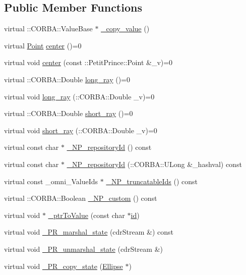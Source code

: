 \subsection*{Public Member Functions}
\begin{DoxyCompactItemize}
\item 
virtual \+::C\+O\+R\+B\+A\+::\+Value\+Base $\ast$ \hyperlink{class_ellipse_a325a05f5f1c4141ec6c99e416564b476}{\+\_\+copy\+\_\+value} ()
\item 
virtual \hyperlink{struct_point}{Point} \hyperlink{class_ellipse_a7c167034ea6380590201091da189a08b}{center} ()=0
\item 
virtual void \hyperlink{class_ellipse_a9002930f3e980351e775592942cac3fc}{center} (const \+::Petit\+Prince\+::\+Point \&\+\_\+v)=0
\item 
virtual \+::C\+O\+R\+B\+A\+::\+Double \hyperlink{class_ellipse_a2656a501e4ee8296f8ec71aa5b63f4db}{long\+\_\+ray} ()=0
\item 
virtual void \hyperlink{class_ellipse_ae089aa3f771974912d1c73d9db94cc70}{long\+\_\+ray} (\+::C\+O\+R\+B\+A\+::\+Double \+\_\+v)=0
\item 
virtual \+::C\+O\+R\+B\+A\+::\+Double \hyperlink{class_ellipse_a836989b508beb2da448363e5ed63aec2}{short\+\_\+ray} ()=0
\item 
virtual void \hyperlink{class_ellipse_a4d6bf30278c2839a5d38aa4351cf3a2f}{short\+\_\+ray} (\+::C\+O\+R\+B\+A\+::\+Double \+\_\+v)=0
\item 
virtual const char $\ast$ \hyperlink{class_ellipse_a0e56c51dadf0c21c5f3c82bd7ae3c34c}{\+\_\+\+N\+P\+\_\+repository\+Id} () const 
\item 
virtual const char $\ast$ \hyperlink{class_ellipse_a61c90841d732f4e69247545fc736c321}{\+\_\+\+N\+P\+\_\+repository\+Id} (\+::C\+O\+R\+B\+A\+::\+U\+Long \&\+\_\+hashval) const 
\item 
virtual const \+\_\+omni\+\_\+\+Value\+Ids $\ast$ \hyperlink{class_ellipse_ae5257f936afdfbbeb0ef3344231fc111}{\+\_\+\+N\+P\+\_\+truncatable\+Ids} () const 
\item 
virtual \+::C\+O\+R\+B\+A\+::\+Boolean \hyperlink{class_ellipse_a020acd78a7f680f73c99dd038170749c}{\+\_\+\+N\+P\+\_\+custom} () const 
\item 
virtual void $\ast$ \hyperlink{class_ellipse_a7a69ec5b0954f4c623c9f450afb71d6c}{\+\_\+ptr\+To\+Value} (const char $\ast$\hyperlink{class_draw_a50509da989141b00a5ae22d68a4d5856}{id})
\item 
virtual void \hyperlink{class_ellipse_a63076fc769000247bd13c910dbf54c9e}{\+\_\+\+P\+R\+\_\+marshal\+\_\+state} (cdr\+Stream \&) const 
\item 
virtual void \hyperlink{class_ellipse_aa4dea62b56229863d757ae8861c225da}{\+\_\+\+P\+R\+\_\+unmarshal\+\_\+state} (cdr\+Stream \&)
\item 
virtual void \hyperlink{class_ellipse_a9959b5cef873ad4debf7ce4841172522}{\+\_\+\+P\+R\+\_\+copy\+\_\+state} (\hyperlink{class_ellipse}{Ellipse} $\ast$)
\end{DoxyCompactItemize}
